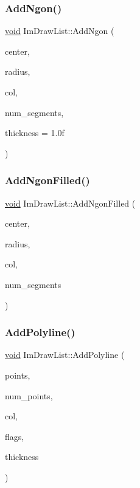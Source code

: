 \subsubsection{\texorpdfstring{Add\+Ngon()}{AddNgon()}}
{\footnotesize\ttfamily \hyperlink{imgui__impl__opengl3__loader_8h_ac668e7cffd9e2e9cfee428b9b2f34fa7}{void} Im\+Draw\+List\+::\+Add\+Ngon (\begin{DoxyParamCaption}\item[{const \hyperlink{structImVec2}{Im\+Vec2} \&}]{center,  }\item[{float}]{radius,  }\item[{Im\+U32}]{col,  }\item[{int}]{num\+\_\+segments,  }\item[{float}]{thickness = {\ttfamily 1.0f} }\end{DoxyParamCaption})}

\mbox{\label{structImDrawList_a75bf382ddc70429f82a570c2782c4491}} 
\subsubsection{\texorpdfstring{Add\+Ngon\+Filled()}{AddNgonFilled()}}
{\footnotesize\ttfamily \hyperlink{imgui__impl__opengl3__loader_8h_ac668e7cffd9e2e9cfee428b9b2f34fa7}{void} Im\+Draw\+List\+::\+Add\+Ngon\+Filled (\begin{DoxyParamCaption}\item[{const \hyperlink{structImVec2}{Im\+Vec2} \&}]{center,  }\item[{float}]{radius,  }\item[{Im\+U32}]{col,  }\item[{int}]{num\+\_\+segments }\end{DoxyParamCaption})}

\mbox{\label{structImDrawList_abc568847b1113e624456436bfab1b307}} 
\subsubsection{\texorpdfstring{Add\+Polyline()}{AddPolyline()}}
{\footnotesize\ttfamily \hyperlink{imgui__impl__opengl3__loader_8h_ac668e7cffd9e2e9cfee428b9b2f34fa7}{void} Im\+Draw\+List\+::\+Add\+Polyline (\begin{DoxyParamCaption}\item[{const \hyperlink{structImVec2}{Im\+Vec2} $\ast$}]{points,  }\item[{int}]{num\+\_\+points,  }\item[{Im\+U32}]{col,  }\item[{Im\+Draw\+Flags}]{flags,  }\item[{float}]{thickness }\end{DoxyParamCaption})}

